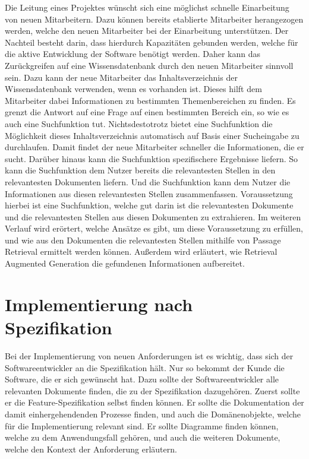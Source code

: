 Die Leitung eines Projektes wünscht sich eine möglichst schnelle Einarbeitung von neuen Mitarbeitern.
Dazu können bereits etablierte Mitarbeiter herangezogen werden, welche den neuen Mitarbeiter bei der Einarbeitung unterstützen.
Der Nachteil besteht darin, dass hierdurch Kapazitäten gebunden werden, welche für die aktive Entwicklung der Software benötigt werden.
Daher kann das Zurückgreifen auf eine Wissensdatenbank durch den neuen Mitarbeiter sinnvoll sein.
Dazu kann der neue Mitarbeiter das Inhaltsverzeichnis der Wissensdatenbank verwenden, wenn es vorhanden ist.
Dieses hilft dem Mitarbeiter dabei Informationen zu bestimmten Themenbereichen zu finden.
Es grenzt die Antwort auf eine Frage auf einen bestimmten Bereich ein, so wie es auch eine Suchfunktion tut.
Nichtsdestotrotz bietet eine Suchfunktion die Möglichkeit dieses Inhaltsverzeichnis automatisch auf Basis einer Sucheingabe zu durchlaufen.
Damit findet der neue Mitarbeiter schneller die Informationen, die er sucht.
Darüber hinaus kann die Suchfunktion spezifischere Ergebnisse liefern.
So kann die Suchfunktion dem Nutzer bereits die relevantesten Stellen in den relevantesten Dokumenten liefern.
Und die Suchfunktion kann dem Nutzer die Informationen aus diesen relevantesten Stellen zusammenfassen.
Voraussetzung hierbei ist eine Suchfunktion, welche gut darin ist die relevantesten Dokumente und die relevantesten Stellen aus diesen Dokumenten zu extrahieren.
Im weiteren Verlauf wird erörtert, welche Ansätze es gibt, um diese Voraussetzung zu erfüllen, und wie aus den Dokumenten die relevantesten Stellen mithilfe von Passage Retrieval ermittelt werden können.
Außerdem wird erläutert, wie Retrieval Augmented Generation die gefundenen Informationen aufbereitet.

\section{Implementierung nach Spezifikation}
\label{chap:implementierung-nach-spezifikation}
Bei der Implementierung von neuen Anforderungen ist es wichtig, dass sich der Softwareentwickler an die Spezifikation hält.
Nur so bekommt der Kunde die Software, die er sich gewünscht hat.
Dazu sollte der Softwareentwickler alle relevanten Dokumente finden, die zu der Spezifikation dazugehören.
Zuerst sollte er die Feature-Spezifikation selbst finden können.
Er sollte die Dokumentation der damit einhergehendenden Prozesse finden, und auch die Domänenobjekte, welche für die Implementierung relevant sind.
Er sollte Diagramme finden können, welche zu dem Anwendungsfall gehören, und auch die weiteren Dokumente, welche den Kontext der Anforderung erläutern.\\

